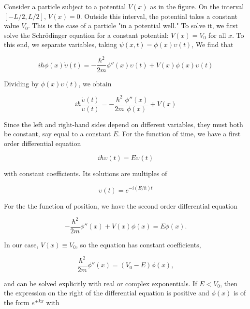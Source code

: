 
Consider a particle subject to a potential $V(x)$ as in the figure. On the interval $[-L/2, L/2]$, $V(x) = 0$.  Outside this interval, the potential takes a constant value $V_0$.  This is the case of a particle "in a potential well."  To solve it, we first solve the Schrödinger equation for a constant potential: $V(x) = V_0$ for all $x$.  To this end, we separate variables, taking $\psi(x,t) = \phi(x)\upsilon(t)$,  We find that

\begin{equation}
i\hbar \phi(x)\dot\upsilon(t) = -\frac{\hbar^2}{2m}\phi''(x)\upsilon(t) + V(x)\phi(x)\upsilon(t)
\end{equation}

Dividing by $\phi(x)\upsilon(t)$, we obtain

\begin{equation}
i\hbar \frac{\dot\upsilon(t)}{\upsilon(t)} = -\frac{\hbar^2}{2m}\frac{\phi''(x)}{\phi(x)} + V(x)
\end{equation}

Since the left and right-hand sides depend on different variables, they must both be constant, say equal to a constant $E$.  For the function of time, we have a first order differential equation

\begin{equation}
i\hbar \dot\upsilon(t) = E\upsilon(t)
\end{equation}

with constant coefficients.  Its solutions are multiples of

\begin{equation}
\upsilon(t) = e^{-i(E/\hbar)t}
\end{equation}

For the the function of position, we have the second order
differential equation

\begin{equation}
 -\frac{\hbar^2}{2m}\phi''(x)+ V(x)\phi(x) = E\phi(x).
\end{equation}

In our case, $V(x) \equiv V_0$, so  the equation has constant coefficients,

\begin{equation}
 \frac{\hbar^2}{2m}\phi''(x) = (V_0-E)\phi(x),
\end{equation}

and can be solved explicitly with real or complex exponentials.  If $E < V_0$, then the expression on the right of the differential equation is positive and $\phi(x)$ is of the form  $e^{\pm kx}$ with


